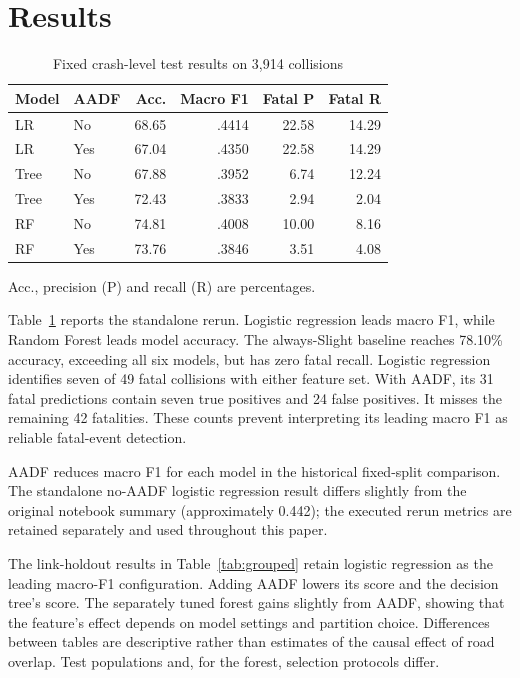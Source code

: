 \documentclass[conference]{IEEEtran}
\begin{document}
\section{Results}
\begin{table}[t]
\caption{Fixed crash-level test results on 3,914 collisions}
\label{tab:crash}
\centering\small
\begin{tabular}{llrrrr}
\toprule
Model & AADF & Acc. & Macro F1 & Fatal P & Fatal R\\
\midrule
LR & No & 68.65 & .4414 & 22.58 & 14.29\\
LR & Yes & 67.04 & .4350 & 22.58 & 14.29\\
Tree & No & 67.88 & .3952 & 6.74 & 12.24\\
Tree & Yes & 72.43 & .3833 & 2.94 & 2.04\\
RF & No & 74.81 & .4008 & 10.00 & 8.16\\
RF & Yes & 73.76 & .3846 & 3.51 & 4.08\\
\bottomrule
\end{tabular}
\par\vspace{3pt}\footnotesize Acc., precision (P) and recall (R) are percentages.
\end{table}

Table~\ref{tab:crash} reports the standalone rerun. Logistic regression leads macro F1, while Random Forest leads model accuracy. The always-Slight baseline reaches 78.10\% accuracy, exceeding all six models, but has zero fatal recall. Logistic regression identifies seven of 49 fatal collisions with either feature set. With AADF, its 31 fatal predictions contain seven true positives and 24 false positives. It misses the remaining 42 fatalities. These counts prevent interpreting its leading macro F1 as reliable fatal-event detection.

AADF reduces macro F1 for each model in the historical fixed-split comparison. The standalone no-AADF logistic regression result differs slightly from the original notebook summary (approximately 0.442); the executed rerun metrics are retained separately and used throughout this paper.



The link-holdout results in Table~\ref{tab:grouped} retain logistic regression as the leading macro-F1 configuration. Adding AADF lowers its score and the decision tree's score. The separately tuned forest gains slightly from AADF, showing that the feature's effect depends on model settings and partition choice. Differences between tables are descriptive rather than estimates of the causal effect of road overlap. Test populations and, for the forest, selection protocols differ.
\end{document}
